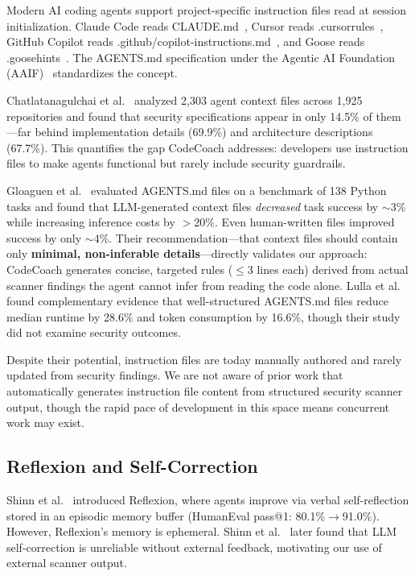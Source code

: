 \documentclass[conference,10pt]{IEEEtran}
\begin{document}
Modern AI coding agents support project-specific instruction files read at session initialization. Claude Code reads CLAUDE.md~\cite{claude-md}, Cursor reads .cursorrules~\cite{cursor-rules}, GitHub Copilot reads .github/copilot-instructions.md~\cite{copilot-instructions}, and Goose reads .goosehints~\cite{goose}. The AGENTS.md specification under the Agentic AI Foundation (AAIF)~\cite{aaif} standardizes the concept.

Chatlatanagulchai et al.~\cite{agent-readmes} analyzed 2,303 agent context files across 1,925 repositories and found that security specifications appear in only 14.5\% of them---far behind implementation details (69.9\%) and architecture descriptions (67.7\%). This quantifies the gap CodeCoach addresses: developers use instruction files to make agents functional but rarely include security guardrails.

Gloaguen et al.~\cite{eth-agents-md} evaluated AGENTS.md files on a benchmark of 138 Python tasks and found that LLM-generated context files \textit{decreased} task success by $\sim$3\% while increasing inference costs by $>$20\%. Even human-written files improved success by only $\sim$4\%. Their recommendation---that context files should contain only \textbf{minimal, non-inferable details}---directly validates our approach: CodeCoach generates concise, targeted rules ($\leq$3 lines each) derived from actual scanner findings the agent cannot infer from reading the code alone. Lulla et al.~\cite{agents-md-efficiency} found complementary evidence that well-structured AGENTS.md files reduce median runtime by 28.6\% and token consumption by 16.6\%, though their study did not examine security outcomes.

Despite their potential, instruction files are today manually authored and rarely updated from security findings. We are not aware of prior work that automatically generates instruction file content from structured security scanner output, though the rapid pace of development in this space means concurrent work may exist.

\subsection{Reflexion and Self-Correction}

Shinn et al.~\cite{reflexion} introduced Reflexion, where agents improve via verbal self-reflection stored in an episodic memory buffer (HumanEval pass@1: 80.1\%$\rightarrow$91.0\%). However, Reflexion's memory is ephemeral. Shinn et al.~\cite{shinn-correction} later found that LLM self-correction is unreliable without external feedback, motivating our use of external scanner output.
\end{document}
